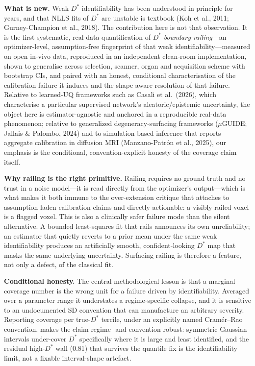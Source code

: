 \documentclass[11pt]{article}
\newcommand{\Dstar}{\ensuremath{D^{*}}}
\begin{document}
\textbf{What is new.} Weak \Dstar{} identifiability has been understood in principle for
years, and that NLLS fits of \Dstar{} are unstable is textbook (Koh et al., 2011;
Gurney-Champion et al., 2018). The contribution here is not that observation. It is the
first systematic, real-data quantification of \Dstar{} \emph{boundary-railing}---an
optimizer-level, assumption-free fingerprint of that weak identifiability---measured on
open in-vivo data, reproduced in an independent clean-room implementation, shown to
generalise across selection, scanner, organ and acquisition scheme with bootstrap CIs,
and paired with an honest, conditional characterisation of the calibration failure it
induces and the shape-aware resolution of that failure. Relative to learned-UQ frameworks
such as Casali et al.\ (2026), which characterise a particular supervised network's
aleatoric/epistemic uncertainty, the object here is estimator-agnostic and anchored in a
reproducible real-data phenomenon; relative to generalized degeneracy-surfacing
frameworks ($\mu$GUIDE; Jallais \& Palombo, 2024) and to simulation-based inference that
reports aggregate calibration in diffusion MRI (Manzano-Patr\'on et al., 2025), our
emphasis is the conditional, convention-explicit honesty of the coverage claim itself.

\textbf{Why railing is the right primitive.} Railing requires no ground truth and no
trust in a noise model---it is read directly from the optimizer's output---which is what
makes it both immune to the over-extension critique that attaches to assumption-laden
calibration claims and directly actionable: a visibly railed voxel is a flagged voxel.
This is also a clinically safer failure mode than the silent alternative. A bounded
least-squares fit that rails announces its own unreliability; an estimator that quietly
reverts to a prior mean under the same weak identifiability produces an artificially
smooth, confident-looking \Dstar{} map that masks the same underlying uncertainty.
Surfacing railing is therefore a feature, not only a defect, of the classical fit.

\textbf{Conditional honesty.} The central methodological lesson is that a marginal
coverage number is the wrong unit for a failure driven by identifiability. Averaged over
a parameter range it understates a regime-specific collapse, and it is sensitive to an
undocumented SD convention that can manufacture an arbitrary severity. Reporting coverage
per true-\Dstar{} tercile, under an explicitly named Cram\'er--Rao convention, makes the
claim regime- and convention-robust: symmetric Gaussian intervals under-cover \Dstar{}
specifically where it is large and least identified, and the residual high-\Dstar{} wall
(0.81) that survives the quantile fix is the identifiability limit, not a fixable
interval-shape artefact.
\end{document}
